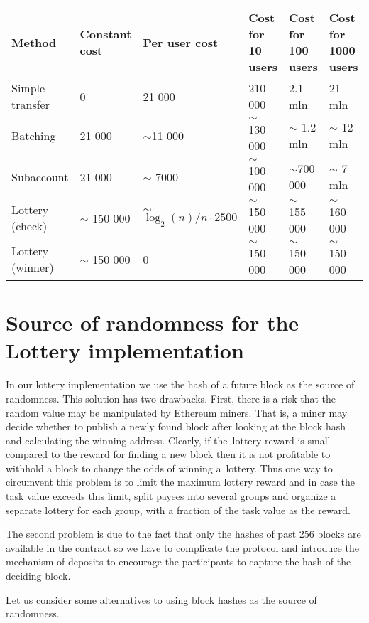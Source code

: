 \documentclass[a4paper]{article}
\begin{document}
    \begin{tabular}{|p{8em}|p{5em}|p{8em}|p{5em}|p{5em}|p{5em}|}
        \hline
        Method & Constant cost & Per user cost & Cost for 10 users & Cost for 100 users & Cost for 1000 users \\ \hline
        Simple transfer & 0 & 21 000 & 210 000 & 2.1 mln & 21 mln \\ \hline
        Batching & 21 000 & $\sim$11 000 & $\sim$ 130 000 & $\sim$ 1.2 mln & $\sim$ 12 mln \\ \hline
        Subaccount & 21 000 & $\sim$ 7000 & $\sim$ 100 000 & $\sim$700 000 & $\sim$ 7 mln \\ \hline
        Lottery (check) & $\sim$ 150 000 & $\sim$ $\log_2(n)/n \cdot 2500 $ & $\sim$ 150 000 & $\sim$ 155 000 &
        $\sim$ 160 000 \\ \hline
        Lottery (winner) & $\sim$ 150 000 & 0 & $\sim$ 150 000 & $\sim$ 150 000 & $\sim$ 150 000 \\ \hline
    \end{tabular}

\section{Source of randomness for the Lottery implementation}
\label{sec:randomness}
    In our lottery implementation we use the hash of a future block as the source of randomness. This solution has
    two drawbacks. First, there is a risk that the random value may be manipulated by Ethereum miners. That is,
    a miner may decide whether to publish a newly found block after looking at the block hash and calculating
    the winning address. Clearly, if the~lottery reward is small compared to the reward for finding a new block
    then it is not profitable to withhold a block to change the odds of winning a~lottery. Thus one way to circumvent
    this problem is to limit the maximum lottery reward and in case the task value exceeds this limit, split payees
    into several groups and organize a separate lottery for each group, with a fraction of the task value as the
    reward.

    The second problem is due to the fact that only the hashes of past 256 blocks are available in the contract
    so we have to complicate the protocol and introduce the mechanism of deposits to encourage the participants
    to capture the hash of the deciding block.

    Let us consider some alternatives to using block hashes as the source of randomness.
\end{document}
